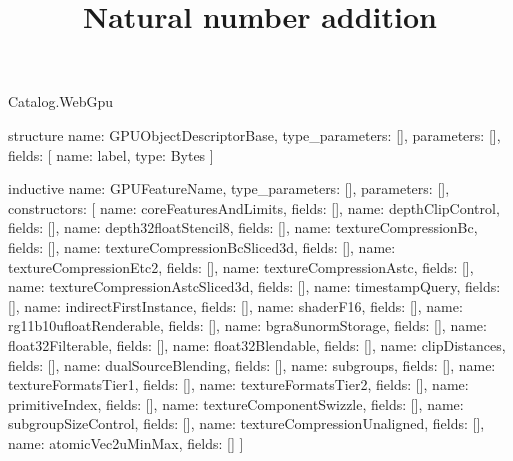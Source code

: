 \begin{lexlean}{Catalog.WebGpu}
\title{Natural number addition}
\begin{semanticmodule}
structure{
  name: GPUObjectDescriptorBase,
  type_parameters: [],
  parameters: [],
  fields: [
    {name: label, type: Bytes}
  ]
}

inductive{
  name: GPUFeatureName,
  type_parameters: [],
  parameters: [],
  constructors: [
    {name: coreFeaturesAndLimits, fields: []},
    {name: depthClipControl, fields: []},
    {name: depth32floatStencil8, fields: []},
    {name: textureCompressionBc, fields: []},
    {name: textureCompressionBcSliced3d, fields: []},
    {name: textureCompressionEtc2, fields: []},
    {name: textureCompressionAstc, fields: []},
    {name: textureCompressionAstcSliced3d, fields: []},
    {name: timestampQuery, fields: []},
    {name: indirectFirstInstance, fields: []},
    {name: shaderF16, fields: []},
    {name: rg11b10ufloatRenderable, fields: []},
    {name: bgra8unormStorage, fields: []},
    {name: float32Filterable, fields: []},
    {name: float32Blendable, fields: []},
    {name: clipDistances, fields: []},
    {name: dualSourceBlending, fields: []},
    {name: subgroups, fields: []},
    {name: textureFormatsTier1, fields: []},
    {name: textureFormatsTier2, fields: []},
    {name: primitiveIndex, fields: []},
    {name: textureComponentSwizzle, fields: []},
    {name: subgroupSizeControl, fields: []},
    {name: textureCompressionUnaligned, fields: []},
    {name: atomicVec2uMinMax, fields: []}
  ]
}


\end{semanticmodule}
\end{lexlean}
